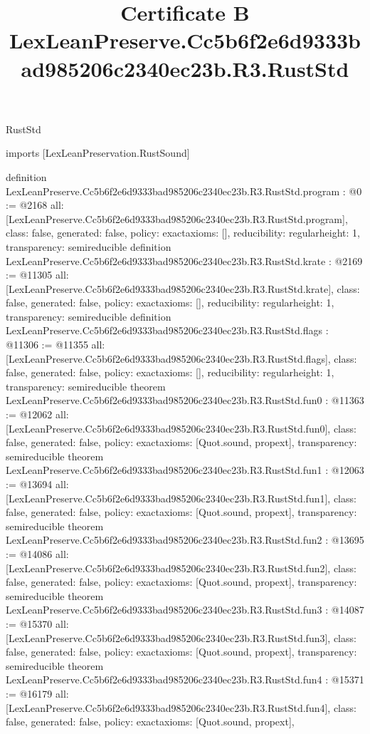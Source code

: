 \begin{lexlean}{RustStd}
\title{Certificate B LexLeanPreserve.Cc5b6f2e6d9333bad985206c2340ec23b.R3.RustStd}
\begin{coremodule}
imports [LexLeanPreservation.RustSound]

definition LexLeanPreserve.Cc5b6f2e6d9333bad985206c2340ec23b.R3.RustStd.program : @0 := @2168 {
  all: [LexLeanPreserve.Cc5b6f2e6d9333bad985206c2340ec23b.R3.RustStd.program],
  class: false,
  generated: false,
  policy: exact{axioms: []},
  reducibility: regular{height: 1},
  transparency: semireducible
}
definition LexLeanPreserve.Cc5b6f2e6d9333bad985206c2340ec23b.R3.RustStd.krate : @2169 := @11305 {
  all: [LexLeanPreserve.Cc5b6f2e6d9333bad985206c2340ec23b.R3.RustStd.krate],
  class: false,
  generated: false,
  policy: exact{axioms: []},
  reducibility: regular{height: 1},
  transparency: semireducible
}
definition LexLeanPreserve.Cc5b6f2e6d9333bad985206c2340ec23b.R3.RustStd.flags : @11306 := @11355 {
  all: [LexLeanPreserve.Cc5b6f2e6d9333bad985206c2340ec23b.R3.RustStd.flags],
  class: false,
  generated: false,
  policy: exact{axioms: []},
  reducibility: regular{height: 1},
  transparency: semireducible
}
theorem LexLeanPreserve.Cc5b6f2e6d9333bad985206c2340ec23b.R3.RustStd.fun0 : @11363 := @12062 {
  all: [LexLeanPreserve.Cc5b6f2e6d9333bad985206c2340ec23b.R3.RustStd.fun0],
  class: false,
  generated: false,
  policy: exact{axioms: [Quot.sound, propext]},
  transparency: semireducible
}
theorem LexLeanPreserve.Cc5b6f2e6d9333bad985206c2340ec23b.R3.RustStd.fun1 : @12063 := @13694 {
  all: [LexLeanPreserve.Cc5b6f2e6d9333bad985206c2340ec23b.R3.RustStd.fun1],
  class: false,
  generated: false,
  policy: exact{axioms: [Quot.sound, propext]},
  transparency: semireducible
}
theorem LexLeanPreserve.Cc5b6f2e6d9333bad985206c2340ec23b.R3.RustStd.fun2 : @13695 := @14086 {
  all: [LexLeanPreserve.Cc5b6f2e6d9333bad985206c2340ec23b.R3.RustStd.fun2],
  class: false,
  generated: false,
  policy: exact{axioms: [Quot.sound, propext]},
  transparency: semireducible
}
theorem LexLeanPreserve.Cc5b6f2e6d9333bad985206c2340ec23b.R3.RustStd.fun3 : @14087 := @15370 {
  all: [LexLeanPreserve.Cc5b6f2e6d9333bad985206c2340ec23b.R3.RustStd.fun3],
  class: false,
  generated: false,
  policy: exact{axioms: [Quot.sound, propext]},
  transparency: semireducible
}
theorem LexLeanPreserve.Cc5b6f2e6d9333bad985206c2340ec23b.R3.RustStd.fun4 : @15371 := @16179 {
  all: [LexLeanPreserve.Cc5b6f2e6d9333bad985206c2340ec23b.R3.RustStd.fun4],
  class: false,
  generated: false,
  policy: exact{axioms: [Quot.sound, propext]},
}
\end{coremodule}
\end{lexlean}
